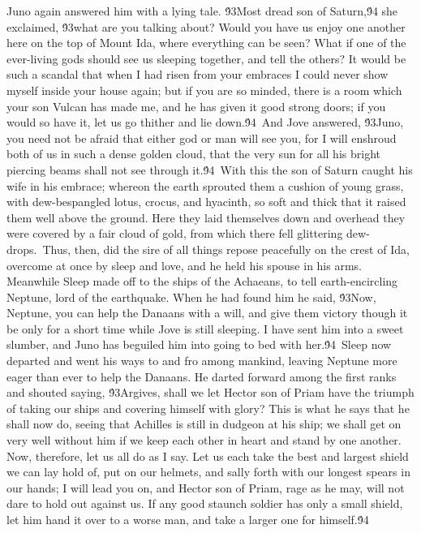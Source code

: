 {Juno again answered him with a lying tale. \'93Most dread son of Saturn,\'94 she exclaimed, \'93what are you talking about? Would you have us enjoy one another here on the top of Mount Ida, where everything can be seen? What if one of the ever-living gods should see us sleeping together, and tell the others? It would be such a scandal that when I had risen from your embraces I could never show myself inside your house again; but if you are so minded, there is a room which your son Vulcan has made me, and he has given it good strong doors; if you would so have it, let us go thither and lie down.\'94\
And Jove answered, \'93Juno, you need not be afraid that either god or man will see you, for I will enshroud both of us in such a dense golden cloud, that the very sun for all his bright piercing beams shall not see through it.\'94\
With this the son of Saturn caught his wife in his embrace; whereon the earth sprouted them a cushion of young grass, with dew-bespangled lotus, crocus, and hyacinth, so soft and thick that it raised them well above the ground. Here they laid themselves down and overhead they were covered by a fair cloud of gold, from which there fell glittering dew-drops.\
Thus, then, did the sire of all things repose peacefully on the crest of Ida, overcome at once by sleep and love, and he held his spouse in his arms. Meanwhile Sleep made off to the ships of the Achaeans, to tell earth-encircling Neptune, lord of the earthquake. When he had found him he said, \'93Now, Neptune, you can help the Danaans with a will, and give them victory though it be only for a short time while Jove is still sleeping. I have sent him into a sweet slumber, and Juno has beguiled him into going to bed with her.\'94\
Sleep now departed and went his ways to and fro among mankind, leaving Neptune more eager than ever to help the Danaans. He darted forward among the first ranks and shouted saying, \'93Argives, shall we let Hector son of Priam have the triumph of taking our ships and covering himself with glory? This is what he says that he shall now do, seeing that Achilles is still in dudgeon at his ship; we shall get on very well without him if we keep each other in heart and stand by one another. Now, therefore, let us all do as I say. Let us each take the best and largest shield we can lay hold of, put on our helmets, and sally forth with our longest spears in our hands; I will lead you on, and Hector son of Priam, rage as he may, will not dare to hold out against us. If any good staunch soldier has only a small shield, let him hand it over to a worse man, and take a larger one for himself.\'94\
}
